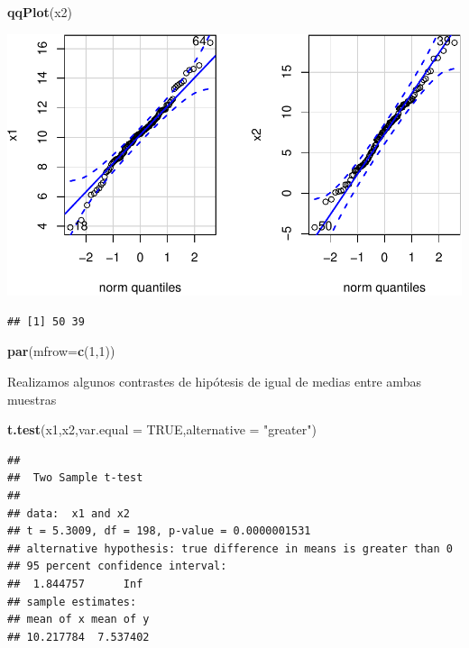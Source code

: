 \documentclass[
]{article}
\newenvironment{Shaded}{\begin{snugshade}}{\end{snugshade}}
\newcommand{\DataTypeTok}[1]{\textcolor[rgb]{0.13,0.29,0.53}{#1}}
\newcommand{\DecValTok}[1]{\textcolor[rgb]{0.00,0.00,0.81}{#1}}
\newcommand{\KeywordTok}[1]{\textcolor[rgb]{0.13,0.29,0.53}{\textbf{#1}}}
\newcommand{\NormalTok}[1]{#1}
\newcommand{\OtherTok}[1]{\textcolor[rgb]{0.56,0.35,0.01}{#1}}
\newcommand{\StringTok}[1]{\textcolor[rgb]{0.31,0.60,0.02}{#1}}
\begin{document}
\begin{Shaded}
\begin{Highlighting}[]
\KeywordTok{qqPlot}\NormalTok{(x2)}
\end{Highlighting}
\end{Shaded}

\includegraphics{taller_problemas_resueltos_extra_1_files/figure-latex/unnamed-chunk-8-2.pdf}

\begin{verbatim}
## [1] 50 39
\end{verbatim}

\begin{Shaded}
\begin{Highlighting}[]
\KeywordTok{par}\NormalTok{(}\DataTypeTok{mfrow=}\KeywordTok{c}\NormalTok{(}\DecValTok{1}\NormalTok{,}\DecValTok{1}\NormalTok{))}
\end{Highlighting}
\end{Shaded}

Realizamos algunos contrastes de hipótesis de igual de medias entre
ambas muestras

\begin{Shaded}
\begin{Highlighting}[]
\KeywordTok{t.test}\NormalTok{(x1,x2,}\DataTypeTok{var.equal =} \OtherTok{TRUE}\NormalTok{,}\DataTypeTok{alternative =} \StringTok{"greater"}\NormalTok{)}
\end{Highlighting}
\end{Shaded}

\begin{verbatim}
## 
##  Two Sample t-test
## 
## data:  x1 and x2
## t = 5.3009, df = 198, p-value = 0.0000001531
## alternative hypothesis: true difference in means is greater than 0
## 95 percent confidence interval:
##  1.844757      Inf
## sample estimates:
## mean of x mean of y 
## 10.217784  7.537402
\end{verbatim}
\end{document}
